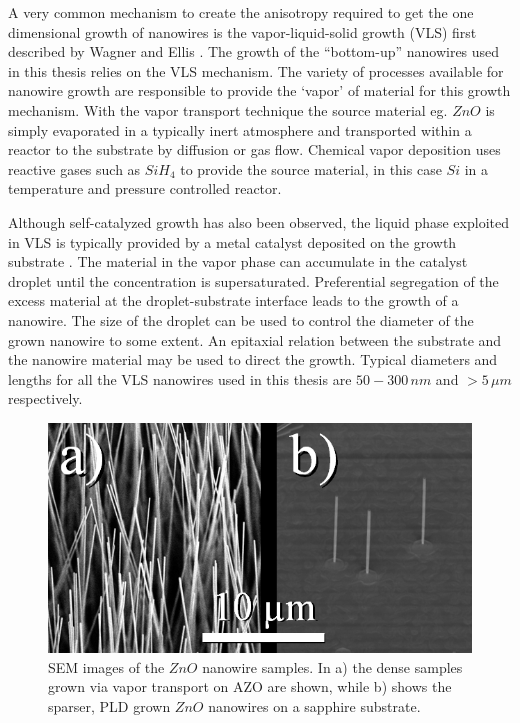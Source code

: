 
A very common mechanism to create the anisotropy required to get the one dimensional growth of nanowires is the vapor-liquid-solid growth (VLS) first described by Wagner and Ellis \cite{wagner_vapor-liquid-solid_1964}. The growth of the ``bottom-up'' nanowires used in this thesis relies on the VLS mechanism. The variety of processes available for nanowire growth are responsible to provide the `vapor' of material for this growth mechanism. With the vapor transport technique the source material eg. $ZnO$ is simply evaporated in a typically inert atmosphere and transported within a reactor to the substrate by diffusion or gas flow. Chemical vapor deposition uses reactive gases such as $SiH_4$ to provide the source material, in this case $Si$ in a temperature and pressure controlled reactor. 


Although self-catalyzed growth has also been observed, the liquid phase exploited in VLS is typically provided by a metal catalyst deposited on the growth substrate \cite{duan_general_2000,wacaser_preferential_2009}. The material in the vapor phase can accumulate in the catalyst droplet until the concentration is supersaturated. Preferential segregation of the excess material at the droplet-substrate interface leads to the growth of a nanowire. The size of the droplet can be used to control the diameter of the grown nanowire to some extent. An epitaxial relation between the substrate and the nanowire material may be used to direct the growth. Typical diameters and lengths for all the VLS nanowires used in this thesis are $50 - 300\,nm$ and $> 5\,\mu m$ respectively. 

\begin{figure}
	\centering
		\includegraphics[width=.5\textwidth]{images/ZnOnanowires.jpg}
	\caption{SEM images of the $ZnO$ nanowire samples. In a) the dense samples grown via vapor transport on AZO are shown, while b) shows the sparser, PLD grown $ZnO$ nanowires on a sapphire substrate.}
	\label{ZnOnanowires}
\end{figure} 

